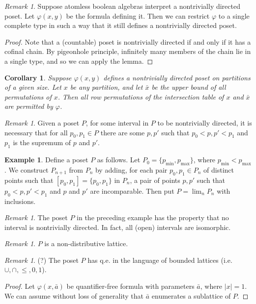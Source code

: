 \documentclass[final,a4paper,12pt]{amsart}
\newtheorem{cor}[thm]{Corollary}
\theoremstyle{remark}
\newtheorem{rem}[thm]{Remark}
\theoremstyle{definition}
\newtheorem{ex}[thm]{Example}
\begin{document}
	\begin{rem}
		Suppose atomless boolean algebras interpret a nontrivially directed poset. Let $\varphi(x,y)$ be the formula defining it. Then we can restrict $\varphi$ to a single complete type in such a way that it still defines a nontrivially directed poset.
	\end{rem}
	\begin{proof}
		Note that a (countable) poset is nontrivially directed if and only if it has a cofinal chain. By pigeonhole principle, infinitely many members of the chain lie in a single type, and so we can apply the lemma. 
	\end{proof}
	
	\begin{cor}
		Suppose $\varphi(x,y)$ defines a nontrivially directed poset on partitions of a given size. Let $x$ be any partition, and let $\bar x$ be the upper bound of all permutations of $x$. Then all row permutations of the intersection table of $x$ and $\bar x$ are permitted by $\varphi$.
	\end{cor}
	
	\begin{rem}
		Given a poset $P$, for some interval in $P$ to be nontrivially directed, it is necessary that for all $p_0,p_1\in P$ there are some $p,p'$ such that $p_0<p,p'<p_1$ and $p_1$ is the supremum of $p$ and $p'$.
	\end{rem}
	
	\begin{ex}
		Define a poset $P$ as follows. Let $P_0=\{p_{\textrm{min}},p_{\textrm{max}}\}$, where $p_{\textrm{min}}<p_{\textrm{max}}$. We construct $P_{n+1}$ from $P_n$ by adding, for each pair $p_0,p_1\in P_n$ of distinct points such that $[p_0,p_1]=\{p_0,p_1\}$ in $P_n$, a pair of points $p,p'$ such that $p_0<p,p'<p_1$ and $p$ and $p'$ are incomparable. Then put $P=\lim_n P_n$ with inclusions.
	\end{ex}
	
	\begin{rem}
		The poset $P$ in the preceding example has the property that no interval is nontrivially directed. In fact, all (open) intervals are isomorphic.
	\end{rem}
	
	\begin{rem}
		$P$ is a non-distributive lattice.
	\end{rem}
	
	\begin{rem}(?)
		The poset $P$ has q.e. in the language of bounded lattices (i.e. $\cup,\cap,\leq,0,1$).
	\end{rem}
	\begin{proof}
		Let $\varphi(x,\bar a)$ be quantifier-free formula with parameters $\bar a$, where $\lvert x\rvert=1$. We can assume without loss of generality that $\bar a$ enumerates a sublattice of $P$.
	\end{proof}
	
\end{document}
